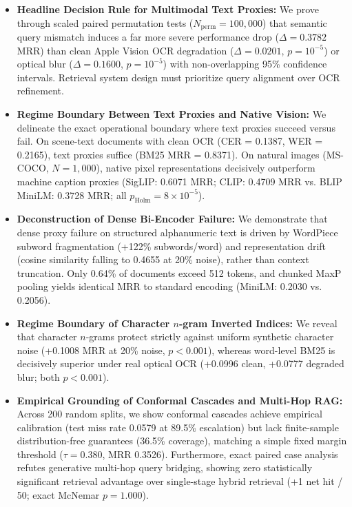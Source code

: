 \begin{itemize}
    \item \textbf{Headline Decision Rule for Multimodal Text Proxies:} We prove through scaled paired permutation tests ($N_{\text{perm}}=100{,}000$) that semantic query mismatch induces a far more severe performance drop ($\Delta = 0.3782$ MRR) than clean Apple Vision OCR degradation ($\Delta = 0.0201$, $p = 10^{-5}$) or optical blur ($\Delta = 0.1600$, $p = 10^{-5}$) with non-overlapping 95\% confidence intervals. Retrieval system design must prioritize query alignment over OCR refinement.

    \item \textbf{Regime Boundary Between Text Proxies and Native Vision:} We delineate the exact operational boundary where text proxies succeed versus fail. On scene-text documents with clean OCR (CER = 0.1387, WER = 0.2165), text proxies suffice (BM25 MRR = 0.8371). On natural images (MS-COCO, $N=1{,}000$), native pixel representations decisively outperform machine caption proxies (SigLIP: 0.6071 MRR; CLIP: 0.4709 MRR vs. BLIP MiniLM: 0.3728 MRR; all $p_{\text{Holm}} = 8 \times 10^{-5}$).

    \item \textbf{Deconstruction of Dense Bi-Encoder Failure:} We demonstrate that dense proxy failure on structured alphanumeric text is driven by WordPiece subword fragmentation (+122\% subwords/word) and representation drift (cosine similarity falling to 0.4655 at 20\% noise), rather than context truncation. Only 0.64\% of documents exceed 512 tokens, and chunked MaxP pooling yields identical MRR to standard encoding (MiniLM: 0.2030 vs. 0.2056).

    \item \textbf{Regime Boundary of Character $n$-gram Inverted Indices:} We reveal that character $n$-grams protect strictly against uniform synthetic character noise (+0.1008 MRR at 20\% noise, $p < 0.001$), whereas word-level BM25 is decisively superior under real optical OCR (+0.0996 clean, +0.0777 degraded blur; both $p < 0.001$).

    \item \textbf{Empirical Grounding of Conformal Cascades and Multi-Hop RAG:} Across 200 random splits, we show conformal cascades achieve empirical calibration (test miss rate 0.0579 at 89.5\% escalation) but lack finite-sample distribution-free guarantees (36.5\% coverage), matching a simple fixed margin threshold ($\tau = 0.380$, MRR 0.3526). Furthermore, exact paired case analysis refutes generative multi-hop query bridging, showing zero statistically significant retrieval advantage over single-stage hybrid retrieval (+1 net hit / 50; exact McNemar $p = 1.000$).
\end{itemize}
